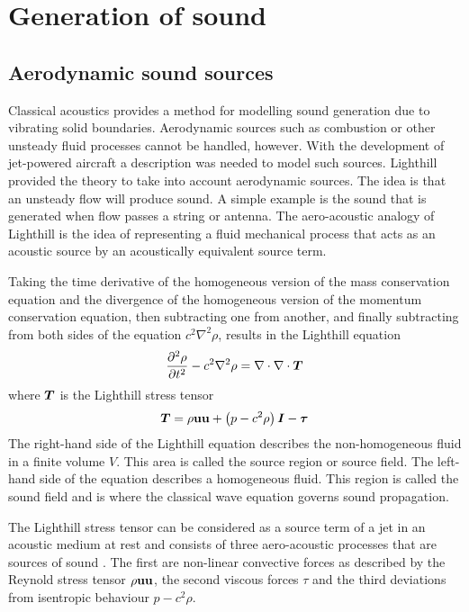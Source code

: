 \section{Generation of sound}

\subsection{Aerodynamic sound sources}\label{sec:theory:sound:aerodynamic}
Classical acoustics provides a method for modelling sound generation due to
vibrating solid boundaries. Aerodynamic sources such as combustion or other
unsteady fluid processes cannot be handled, however. With the development of
jet-powered aircraft a description was needed to model such sources. Lighthill
provided the theory to take into account aerodynamic sources. The idea is that
an unsteady flow will produce sound. A simple example is the sound that is
generated when flow passes a string or antenna.
The aero-acoustic analogy of Lighthill is the idea of representing a fluid
mechanical process that acts as an acoustic source by an acoustically equivalent
source term.


Taking the time derivative of the homogeneous version of the mass conservation
equation and the divergence of the homogeneous version of the momentum
conservation equation, then subtracting one from another, and finally
subtracting from both sides of the equation $c^2 \nabla^2 \rho$, results in the
Lighthill equation
\begin{equation}\label{eq:theory:sound:generation:lighthill}
  \frac{\partial^2 \rho}{\partial t^2} - c^2 \nabla^2 \rho = \nabla \cdot \nabla \cdot \bm{T}
\end{equation}
where $\bm{T}$ is the Lighthill stress tensor
\begin{equation}
  \bm{T} = \rho \mathbf{u}\mathbf{u} + \left( p - c^2 \rho \right) \bm{I} - \bm{\tau}
\end{equation}
The right-hand side of the Lighthill equation describes the non-homogeneous
fluid in a finite volume $V$. This area is called the source region or source
field. The left-hand side of the equation describes a homogeneous fluid. This
region is called the sound field and is where the classical wave equation
governs sound propagation.

The Lighthill stress tensor can be considered as a source term of a jet in an
acoustic medium at rest and consists of three aero-acoustic processes that are
sources of sound \cite{Rienstra2017}. The first are non-linear convective forces
as described by the Reynold stress tensor $\rho \mathbf{u}\mathbf{u}$, the second
viscous forces $\tau$ and the third deviations from isentropic behaviour $p - c^2 \rho$.


